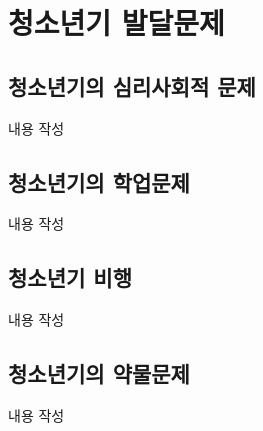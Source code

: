 \section{청소년기 발달문제}

\subsection{청소년기의 심리사회적 문제}
내용 작성

\subsection{청소년기의 학업문제}
내용 작성

\subsection{청소년기 비행}
내용 작성

\subsection{청소년기의 약물문제}
내용 작성
